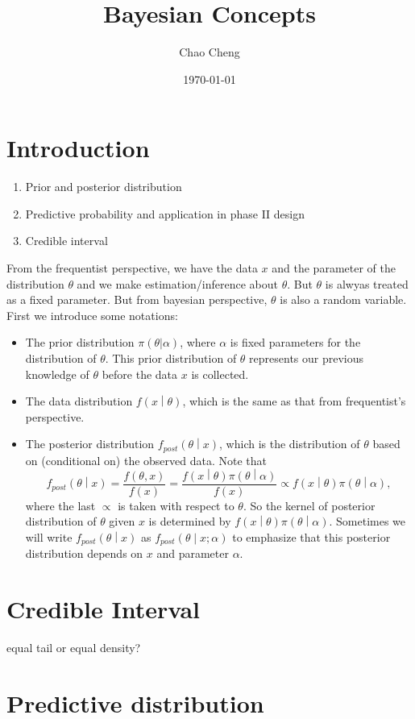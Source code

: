 \documentclass[a4paper,12pt]{article}
\title{Bayesian Concepts}
\author{Chao Cheng}
\date{\today}
\begin{document}
\maketitle
\tableofcontents{}

\section{Introduction}
\label{sec:introduction}

\begin{enumerate}
\item Prior and posterior distribution
\item Predictive probability and application in phase II design
\item Credible interval
\end{enumerate}

From the frequentist perspective, we have the data $x$ and the parameter of the distribution $\theta$ and we make estimation/inference about $\theta$. But $\theta$ is alwyas treated as a fixed parameter. But from bayesian perspective, $\theta$ is also a random variable.
First we introduce some notations:

\begin{itemize}
\item The prior distribution
  $\pi\left(\theta | \alpha\right)$, where $\alpha$ is fixed parameters for the distribution of $\theta$. This prior distribution of $\theta$ represents our previous  knowledge of $\theta$ before the data $x$ is collected.
\item The data distribution
  $f\left(x\middle|\theta\right)$, which is the same as that from frequentist's perspective.
\item The posterior distribution
  $f_{post}\left(\theta\middle| x\right)$, which is the distribution of $\theta$ based on (conditional on) the observed data. Note that
  \[
    f_{post}\left(\theta\middle| x\right)
    = \frac{f\left(\theta, x\right)}{f\left(x\right)}
    = \frac{
      f\left(x\middle|\theta\right)\pi\left(\theta\middle|\alpha\right)
    }{f\left(x\right)}
    \propto f\left(x\middle|\theta\right)\pi\left(\theta\middle|\alpha\right)
    ,
  \]
  where the last $\propto$ is taken with respect to $\theta$. So the kernel of posterior distribution of $\theta$ given $x$ is determined by $f\left(x\middle|\theta\right)\pi\left(\theta\middle|\alpha\right)$. Sometimes we will write $f_{post}\left(\theta\middle|x\right)$ as $f_{post}\left(\theta\middle|x;\alpha\right)$ to emphasize that this posterior distribution depends on $x$ and parameter $\alpha$.
\end{itemize}

\section{Credible Interval}
\label{sec:credible-interval}

equal tail or equal density?



\section{Predictive distribution}
\label{sec:pred-distr}








\end{document}
